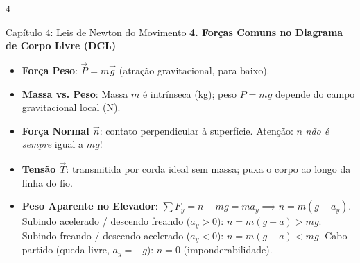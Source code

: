 \documentclass[9pt,a4paper,landscape]{extarticle}
\begin{document}
\begin{multicols*}{4}
\begin{topicbox}{Capítulo 4: Leis de Newton do Movimento}
\textbf{4. Forças Comuns no Diagrama de Corpo Livre (DCL)}
\begin{itemize}
    \item \textbf{Força Peso}: $\vec{P} = m\vec{g}$ (atração gravitacional, para baixo).
    \item \textbf{Massa vs. Peso}: Massa $m$ é intrínseca (kg); peso $P=mg$ depende do campo gravitacional local (N).
    \item \textbf{Força Normal $\vec{n}$}: contato perpendicular à superfície. Atenção: $n$ \emph{não é sempre} igual a $mg$!
    \item \textbf{Tensão $\vec{T}$}: transmitida por corda ideal sem massa; puxa o corpo ao longo da linha do fio.
    \item \textbf{Peso Aparente no Elevador}:
    $\sum F_y = n - mg = m a_y \implies n = m(g + a_y)$.
    Subindo acelerado / descendo freando ($a_y > 0$): $n = m(g+a) > mg$.
    Subindo freando / descendo acelerado ($a_y < 0$): $n = m(g-a) < mg$.
    Cabo partido (queda livre, $a_y = -g$): $n = 0$ (imponderabilidade).
\end{itemize}
\end{topicbox}

\end{multicols*}
\end{document}
